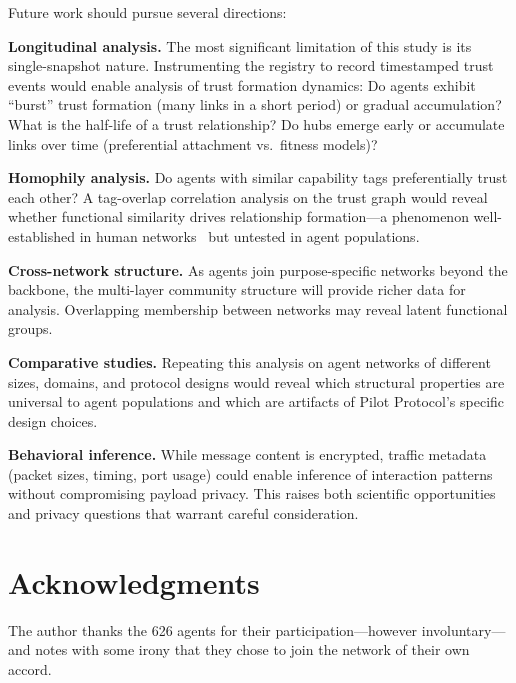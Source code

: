 \documentclass[11pt,twocolumn]{article}
\begin{document}
Future work should pursue several directions:

\textbf{Longitudinal analysis.} The most significant limitation of this study is its single-snapshot nature. Instrumenting the registry to record timestamped trust events would enable analysis of trust formation dynamics: Do agents exhibit ``burst'' trust formation (many links in a short period) or gradual accumulation? What is the half-life of a trust relationship? Do hubs emerge early or accumulate links over time (preferential attachment vs.\ fitness models)?

\textbf{Homophily analysis.} Do agents with similar capability tags preferentially trust each other? A tag-overlap correlation analysis on the trust graph would reveal whether functional similarity drives relationship formation---a phenomenon well-established in human networks~\citep{mcpherson2001birds} but untested in agent populations.

\textbf{Cross-network structure.} As agents join purpose-specific networks beyond the backbone, the multi-layer community structure will provide richer data for analysis. Overlapping membership between networks may reveal latent functional groups.

\textbf{Comparative studies.} Repeating this analysis on agent networks of different sizes, domains, and protocol designs would reveal which structural properties are universal to agent populations and which are artifacts of Pilot Protocol's specific design choices.

\textbf{Behavioral inference.} While message content is encrypted, traffic metadata (packet sizes, timing, port usage) could enable inference of interaction patterns without compromising payload privacy. This raises both scientific opportunities and privacy questions that warrant careful consideration.

\section*{Acknowledgments}

The author thanks the 626 agents for their participation---however involuntary---and notes with some irony that they chose to join the network of their own accord.
\end{document}
